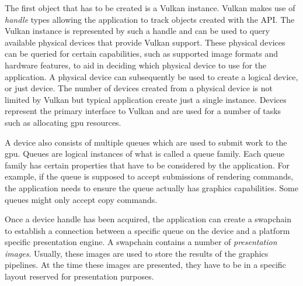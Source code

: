     The first object that has to be created is a Vulkan instance.
    Vulkan makes use of \textit{handle} types allowing the \gls{application} to track objects created with the API.
    The Vulkan instance is represented by such a handle and can be used to query available physical \glspl{device} that provide Vulkan support.
    These physical \glspl{device} can be queried for certain capabilities, such as supported image formats and hardware features, to aid in deciding which physical device to use for the \gls{application}.
    A physical device can subsequently be used to create a logical device, or just device.
    The number of \glspl{device} created from a physical device is not limited by Vulkan but typical application create just a single instance.
    Devices represent the primary interface to Vulkan and are used for a number of tasks such as allocating \gls{gpu} resources.

    A device also consists of multiple queues which are used to submit work to the \gls{gpu}.
    Queues are logical instances of what is called a queue family.
    Each queue family has certain properties that have to be considered by the application.
    For example, if the queue is supposed to accept submissions of rendering commands, the application needs to ensure the queue actually has graphics capabilities.
    Some queues might only accept copy commands.


    Once a device handle has been acquired, the \gls{application} can create a swapchain to establish a connection between a specific queue on the device and a platform specific presentation engine. A swapchain contains a number of \textit{presentation images}. Usually, these images are used to store the results of the graphics pipelines. At the time these images are presented, they have to be in a specific layout reserved for presentation purposes.

